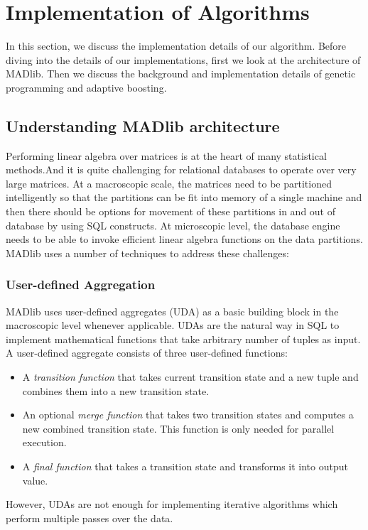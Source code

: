\section{Implementation of Algorithms}
\label{sec:imp}
In this section, we discuss the implementation details of our algorithm. Before diving into the details of our implementations, first we look at the architecture of MADlib. Then we discuss the background and implementation details of genetic programming and adaptive boosting.
\subsection{Understanding MADlib architecture}
Performing linear algebra over matrices is at the heart of many statistical methods.And it is quite challenging for relational databases to operate over very large matrices. At a macroscopic scale, the matrices need to be partitioned intelligently so that the partitions can be fit into memory of a single machine and then there should be options for movement of these partitions in and out of database by using SQL constructs. At microscopic level, the database engine needs to be able to invoke efficient linear algebra functions on the data partitions. MADlib uses a number of techniques to address these challenges:

\subsubsection*{User-defined Aggregation}
MADlib uses user-defined aggregates (UDA) as a basic building block in the macroscopic level whenever applicable. UDAs are the natural way in SQL to implement mathematical functions that take arbitrary number of tuples as input. A user-defined aggregate consists of three user-defined functions:
\begin{itemize}
\item A {\it transition function} that takes current transition state and a new tuple and combines them into a new transition state.
\item An optional {\it merge function} that takes two transition states and computes a new combined transition state. This function is only needed for parallel execution.
\item A {\it final function} that takes a transition state and transforms it into output value.
\end{itemize}

However, UDAs are not enough for implementing iterative algorithms which perform multiple passes over the data.

